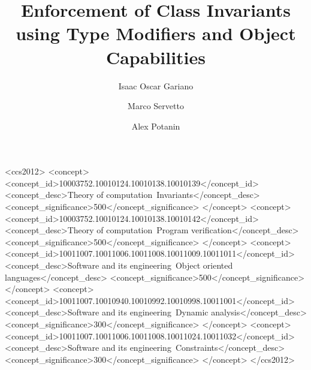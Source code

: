 \documentclass[english,submission,code=tt]{programming}
\theoremstyle{plain}
\begin{document}
\title{Enforcement of Class Invariants using Type Modifiers and Object Capabilities}
\author{Isaac Oscar Gariano}
\author{Marco Servetto}
\author{Alex Potanin}



\begin{CCSXML}
<ccs2012>
	<concept>
		<concept_id>10003752.10010124.10010138.10010139</concept_id>
		<concept_desc>Theory of computation~Invariants</concept_desc>
		<concept_significance>500</concept_significance>
	</concept>
	<concept>
		<concept_id>10003752.10010124.10010138.10010142</concept_id>
		<concept_desc>Theory of computation~Program verification</concept_desc>
		<concept_significance>500</concept_significance>
	</concept>
	<concept>
		<concept_id>10011007.10011006.10011008.10011009.10011011</concept_id>
		<concept_desc>Software and its engineering~Object oriented languages</concept_desc>
		<concept_significance>500</concept_significance>
	</concept>
	<concept>
		<concept_id>10011007.10010940.10010992.10010998.10011001</concept_id>
		<concept_desc>Software and its engineering~Dynamic analysis</concept_desc>
		<concept_significance>300</concept_significance>
	</concept>
	<concept>
		<concept_id>10011007.10011006.10011008.10011024.10011032</concept_id>
		<concept_desc>Software and its engineering~Constraints</concept_desc>
		<concept_significance>300</concept_significance>
	</concept>
</ccs2012>
\end{CCSXML}


\maketitle
\end{document}
